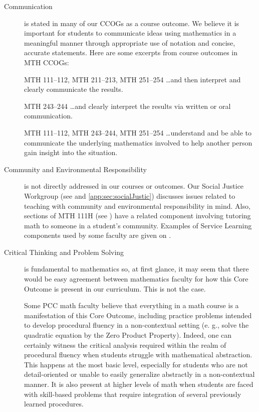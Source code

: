 \begin{description}
	\item[Communication] is stated in many of our CCOGs as a course outcome.
	      We believe it is important for students to communicate ideas using mathematics in a meaningful manner through appropriate use of notation and concise, accurate statements.
	      Here are some excerpts from course outcomes in MTH CCOGs: \begin{aquote}{MTH 111--112, MTH 211--213, MTH 251--254} {\ldots}and then interpret and clearly communicate the results.
	      \end{aquote}

	      \begin{aquote}{MTH 243--244}
		      {\ldots}and clearly interpret the results via written or oral communication.
	      \end{aquote}

	      \begin{aquote}{MTH 111--112, MTH 243--244, MTH 251--254}
		      {\ldots}understand and be able to communicate the underlying mathematics
		      involved to help another person gain insight into the situation.
	      \end{aquote}

	\item[Community and Environmental Responsibility] is not directly addressed in
	      our courses or outcomes.
	      Our Social Justice Workgroup (see  and \vref{app:sec:socialJustic}) discusses issues related to teaching with community and environmental responsibility in mind.
	      Also, sections of MTH 111H (see ) have a related component involving tutoring math to someone in a student's community.
	      Examples of Service Learning components used by some faculty are given on .

	\item[Critical Thinking and Problem Solving]
	      is fundamental to mathematics so, at first glance, it may seem that there would
	      be easy agreement between mathematics faculty for how this Core Outcome is
	      present in our curriculum.
	      This is not the case.

	      Some PCC math faculty believe that everything in a math course is a manifestation of this Core Outcome, including practice problems intended to develop procedural fluency in a non-contextual setting (e.
	      g., solve the quadratic
	      equation by the Zero Product Property).
	      Indeed, one can certainly witness the critical analysis required within the realm of procedural fluency when students struggle with  mathematical abstraction.
	      This happens at the most basic level, especially for students who are not detail-oriented or unable to easily generalize abstractly in a non-contextual manner.
	      It is also present at higher levels of math when students are faced with skill-based problems that require integration of several previously learned procedures.


\end{description}
